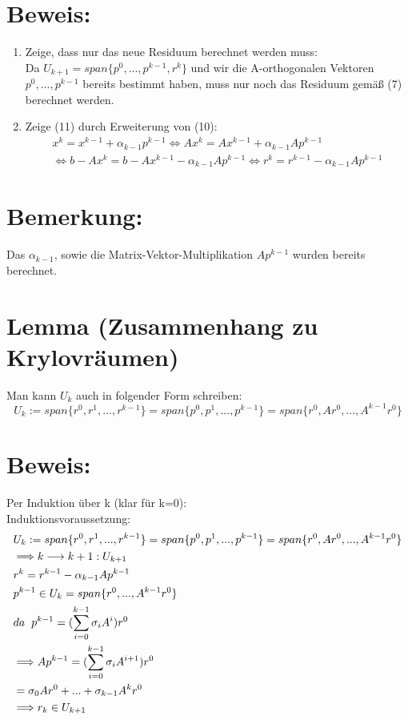 \documentclass{article}
\begin{document}
\section{Beweis:}
\begin{enumerate}
\item Zeige, dass nur das neue Residuum berechnet werden muss:
\\Da $U_{k+1} = span\{p^{0},...,p^{k-1},r^{k}\}$ und wir die A-orthogonalen Vektoren $p^{0},...,p^{k-1}$ bereits bestimmt haben, muss nur noch das Residuum gemäß (7) berechnet werden.
\item Zeige (11) durch Erweiterung von (10):
\begin{equation*}
\begin{split}
x^{k} = x^{k-1} + \alpha_{k-1}p^{k-1}
\Longleftrightarrow Ax^{k} = Ax^{k-1} + \alpha_{k-1}Ap^{k-1}\\
\Longleftrightarrow b - Ax^{k} = b - Ax^{k-1} - \alpha_{k-1}Ap^{k-1}
\Longleftrightarrow r^{k} = r^{k-1} - \alpha_{k-1}Ap^{k-1}
\end{split}
\end{equation*}
\end{enumerate}

\section{Bemerkung:}
Das $\alpha_{k-1}$, sowie die Matrix-Vektor-Multiplikation $Ap^{k-1}$ wurden bereits berechnet.

\section{Lemma (Zusammenhang zu Krylovräumen)}
Man kann $U_{k}$ auch in folgender Form schreiben:
\begin{equation}
U_{k} := span\{r^{0}, r^{1},...,r^{k-1}\} = span\{p^{0},p^{1},...,p^{k-1}\} = span\{r^{0}, Ar^{0},...,A^{k-1}r^{0}\}
\end{equation}

\section{Beweis:}
Per Induktion über k (klar für k=0):
\\Induktionsvoraussetzung:
\begin{align*}
& U_{k} := span\{r^{0}, r^{1},...,r^{k-1}\} = span\{p^{0},p^{1},...,p^{k-1}\} = span\{r^{0}, Ar^{0},...,A^{k-1}r^{0}\}\\
& \Longrightarrow k \longrightarrow k+1: U_{k+1}\\
& r^{k} = r^{k-1} - \alpha_{k-1} Ap^{k-1}\\
& p^{k-1} \in U_{k} = span\{r^{0},...,A^{k-1}r^{0}\}\\
& da \hspace{2mm} p^{k-1} = (\sum_{i=0}^{k-1} \sigma_{i}A^{i})r^{0}\\
& \Longrightarrow Ap^{k-1} = (\sum_{i=0}^{k-1} \sigma_{i}A^{i+1})r^{0}\\
& = \sigma_{0}Ar^{0} + ... + \sigma_{k-1}A^{k}r^{0}\\
& \Longrightarrow r_{k} \in U_{k+1}
\end{align*}
\end{document}
